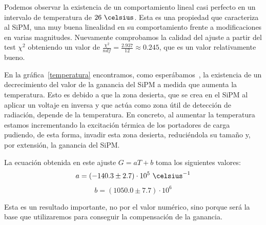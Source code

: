 \begin{itemize}
Podemos observar la existencia de un comportamiento lineal casi perfecto en un intervalo de temperatura de $26~\celsius$. Esta es una propiedad que caracteriza al SiPM, una muy buena linealidad en su comportamiento frente a modificaciones en varias magnitudes. Nuevamente comprobamos la calidad del ajuste a partir del test $\chi^2$ obteniendo un valor de $\frac{\chi^2}{ndf}=\frac{2.937}{12}\approx 0.245$, que es un valor relativamente bueno.

En la gráfica~\ref{temperatura} encontramos, como esperábamos~\cite{tesisSiPM}, la existencia de un decrecimiento del valor de la ganancia del SiPM a medida que aumenta la temperatura. Esto es debido a que la zona desierta, que se crea en el SiPM al aplicar un voltaje en inversa y que actúa como zona útil de detección de radiación, depende de la temperatura. En concreto, al aumentar la temperatura estamos incrementando la excitación térmica de los portadores de carga pudiendo, de esta forma, invadir esta zona desierta, reduciéndola su tamaño y, por extensión, la ganancia del SiPM.

La ecuación obtenida en este ajuste $G=aT+b$ toma los siguientes valores: 
\begin{equation}
a=(-140.3 \pm 2.7) \cdot 10^5~\celsius^{-1}
\label{ajustependientetemperatura}
\end{equation}
\begin{equation}
b=(1050.0 \pm 7.7) \cdot 10^6
\label{ajusteordenadatemperatura}
\end{equation}


Esta es un resultado importante, no por el valor numérico, sino porque será la base que utilizaremos para conseguir la compensación de la ganancia.
\end{itemize}